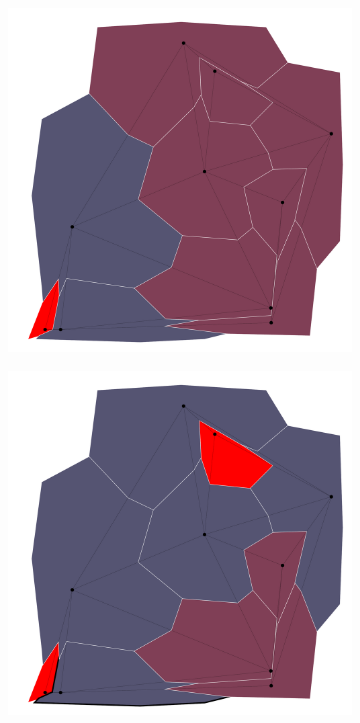 \documentclass{article}
\begin{document}
		\begin{figure}[h!]
			\begin{subfigure}{0.18\textwidth}
				\centering
				\includegraphics[width=\textwidth]{images/sequences/forward_backtracking/bt_forward_I00003}
				\caption{}
			\end{subfigure}
			\;
			\begin{subfigure}{0.18\textwidth}
				\centering
				\includegraphics[width=\textwidth]{images/sequences/forward_backtracking/bt_forward_I00005}

\end{subfigure}
\end{figure}
\end{document}
